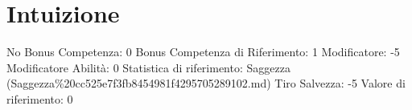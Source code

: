 \section{Intuizione}\label{intuizione}

\begin{description}
\tightlist
\item[Tags: ABI]
No Bonus Competenza: 0 Bonus Competenza di Riferimento: 1 Modificatore:
-5 Modificatore Abilità: 0 Statistica di riferimento: Saggezza
(Saggezza\%20cc525e7f3fb8454981f4295705289102.md) Tiro Salvezza: -5
Valore di riferimento: 0
\end{description}
